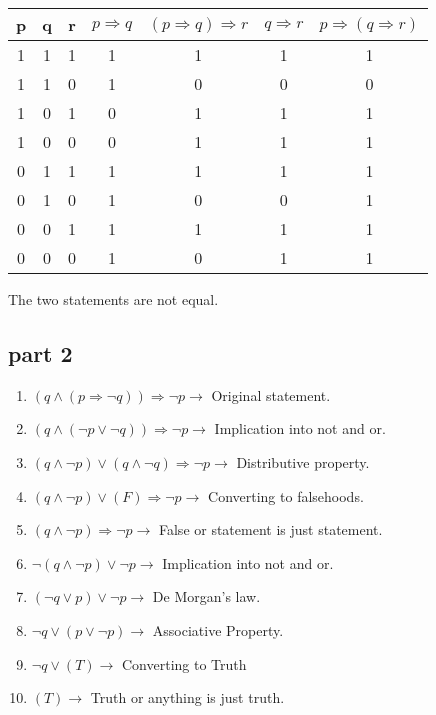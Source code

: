 \documentclass[a4paper,12pt]{article}
\begin{document}
\begin{center}
  \begin{tabular}{ |c|c|c|c|c|c|c| }
    \hline
    p & q & r & $p \Rightarrow q$ & $(p \Rightarrow q) \Rightarrow r$ & $q \Rightarrow r$ & $p \Rightarrow (q \Rightarrow r)$  \\ \hline
    1 & 1 & 1 & 1 & 1 & 1 & 1 \\ \hline
    1 & 1 & 0 & 1 & 0 & 0 & 0 \\ \hline
    1 & 0 & 1 & 0 & 1 & 1 & 1 \\ \hline
    1 & 0 & 0 & 0 & 1 & 1 & 1 \\ \hline
    0 & 1 & 1 & 1 & 1 & 1 & 1 \\ \hline
    0 & 1 & 0 & 1 & 0 & 0 & 1 \\ \hline
    0 & 0 & 1 & 1 & 1 & 1 & 1 \\ \hline
    0 & 0 & 0 & 1 & 0 & 1 & 1 \\ 
    \hline
  \end{tabular}
\end{center}

The two statements are not equal.
\subsection{part 2}
\label{sec4}
\begin{enumerate}
    \item $(q \wedge (p \Rightarrow \neg q)) \Rightarrow \neg p \longrightarrow $ Original statement.
    \item $(q \wedge (\neg p \vee \neg q)) \Rightarrow \neg p \longrightarrow $ Implication into not and or.
    \item $(q \wedge \neg p) \vee (q \wedge \neg q) \Rightarrow \neg p \longrightarrow$ Distributive property.
    \item $(q \wedge \neg p) \vee (F) \Rightarrow \neg p \longrightarrow$ Converting to falsehoods.
    \item $(q \wedge \neg p) \Rightarrow \neg p \longrightarrow$ False or statement is just statement.
    \item $\neg(q \wedge \neg p) \vee \neg p \longrightarrow$ Implication into not and or.
    \item $(\neg q \vee p) \vee \neg p \longrightarrow$ De Morgan's law.
    \item $\neg q \vee (p \vee \neg p) \longrightarrow$ Associative Property.
    \item $\neg q \vee (T) \longrightarrow$ Converting to Truth
    \item $(T) \longrightarrow$ Truth or anything is just truth.
\end{enumerate}
\end{document}
